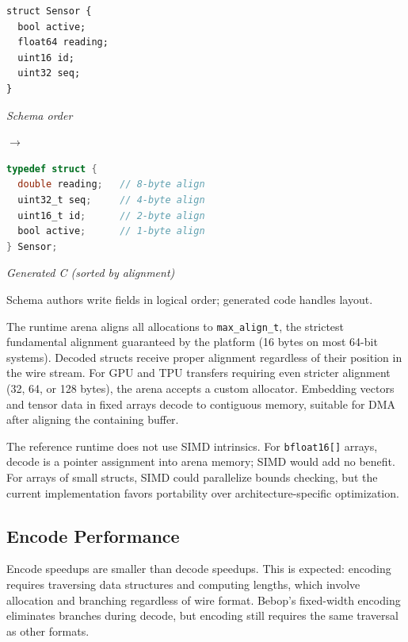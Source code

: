 \documentclass[11pt,onecolumn]{article}
\begin{document}
\vspace{4pt}
\noindent\begin{minipage}{\textwidth}
\footnotesize
\begin{minipage}[t]{0.38\textwidth}
\begin{lstlisting}[language=bebop,aboveskip=2pt,belowskip=0pt]
struct Sensor {
  bool active;
  float64 reading;
  uint16 id;
  uint32 seq;
}
\end{lstlisting}
\centering\scriptsize\textit{Schema order}
\end{minipage}\hfill
$\rightarrow$\hfill
\begin{minipage}[t]{0.52\textwidth}
\begin{lstlisting}[language=C,aboveskip=2pt,belowskip=0pt]
typedef struct {
  double reading;   // 8-byte align
  uint32_t seq;     // 4-byte align
  uint16_t id;      // 2-byte align
  bool active;      // 1-byte align
} Sensor;
\end{lstlisting}
\centering\scriptsize\textit{Generated C (sorted by alignment)}
\end{minipage}
\end{minipage}

\vspace{4pt}
\noindent Schema authors write fields in logical order; generated code handles layout.

The runtime arena aligns all allocations to \texttt{max\_align\_t}, the strictest fundamental alignment guaranteed by the platform (16 bytes on most 64-bit systems). Decoded structs receive proper alignment regardless of their position in the wire stream. For GPU and TPU transfers requiring even stricter alignment (32, 64, or 128 bytes), the arena accepts a custom allocator. Embedding vectors and tensor data in fixed arrays decode to contiguous memory, suitable for DMA after aligning the containing buffer.

The reference runtime does not use SIMD intrinsics. For \texttt{bfloat16[]} arrays, decode is a pointer assignment into arena memory; SIMD would add no benefit. For arrays of small structs, SIMD could parallelize bounds checking, but the current implementation favors portability over architecture-specific optimization.

\subsection{Encode Performance}

Encode speedups are smaller than decode speedups. This is expected: encoding requires traversing data structures and computing lengths, which involve allocation and branching regardless of wire format. Bebop's fixed-width encoding eliminates branches during decode, but encoding still requires the same traversal as other formats.
\end{document}
